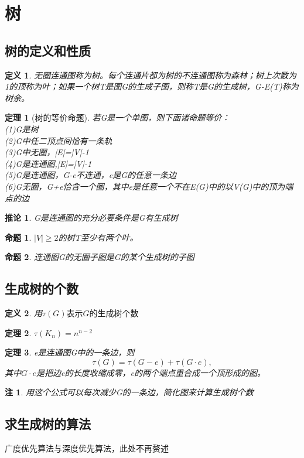 \documentclass[UTF8]{ctexart}
\newtheorem{dfnt}{定义}
\newtheorem{thr}{定理}
\newtheorem*{coro}{推论}
\newtheorem*{note}{注}
\newtheorem{pro}{命题}
\begin{document}
\section{树}
\subsection{树的定义和性质}
\begin{dfnt}
无圈连通图称为树。每个连通片都为树的不连通图称为森林；树上次数为1的顶称为叶；如果一个树T是图G的生成子图，则称T是G的生成树，G-E(T)称为树余。
\end{dfnt}
\begin{thr}[树的等价命题]
若G是一个单图，则下面诸命题等价：\\(1)G是树\\(2)G中任二顶点间恰有一条轨\\(3)G中无圈，|E|=|V|-1\\(4)G是连通图,|E|=|V|-1\\(5)G是连通图，G-e不连通，e是G的任意一条边\\(6)G无圈，G+e恰含一个圈，其中e是任意一个不在E(G)中的以V(G)中的顶为端点的边
\end{thr}
\begin{coro}
G是连通图的充分必要条件是G有生成树
\end{coro}
\begin{pro}
$|V| \geq 2$的树T至少有两个叶。 
\end{pro}
\begin{pro}
连通图G的无圈子图是G的某个生成树的子图
\end{pro}
\subsection{生成树的个数}
\begin{dfnt}
用$\tau (G)表示G的生成树个数$
\end{dfnt}
\begin{thr}
$\tau (K_n)=n^{n-2}$ 
\end{thr}
\begin{thr}
e是连通图G中的一条边，则$$\tau (G) = \tau (G-e) + \tau (G \cdot e),$$其中$G \cdot e$是把边e的长度收缩成零，e的两个端点重合成一个顶形成的图。
\end{thr}
\begin{note}
用这个公式可以每次减少G的一条边，简化图来计算生成树个数
\end{note}
\subsection{求生成树的算法}
广度优先算法与深度优先算法，此处不再赘述
\end{document}
